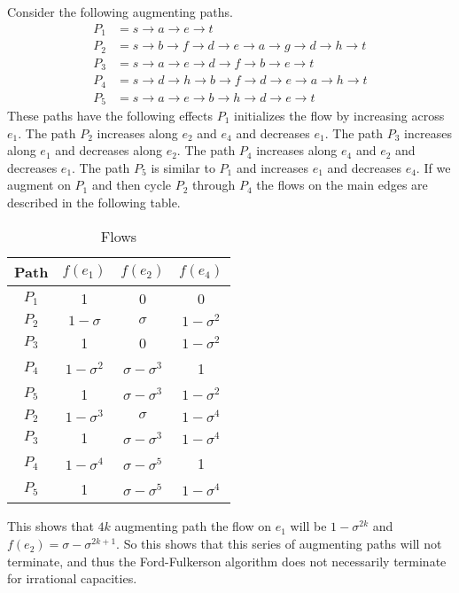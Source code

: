 \documentclass[11pt, oneside]{article}
\begin{document}
\begin{enumerate}
    Consider the following augmenting paths.
    \begin{align*}
      P_1 &= s \to a \to e \to t \\
      P_2 &= s \to b \to f \to d \to e \to a \to g \to d \to h \to t \\
      P_3 &= s \to a \to e \to d \to f \to b \to e \to t \\
      P_4 &= s \to d \to h \to b \to f \to d \to e \to a \to h \to t \\
      P_5 &= s \to a \to e \to b \to h \to d \to e \to t
    \end{align*}
    These paths have the following effects $P_1$ initializes the flow by
    increasing across $e_1$.
    The path $P_2$ increases along $e_2$ and $e_4$ and decreases $e_1$.
    The path $P_3$ increases along $e_1$ and decreases along $e_2$.
    The path $P_4$ increases along $e_4$ and $e_2$ and decreases $e_1$.
    The path $P_5$ is similar to $P_1$ and increases $e_1$ and decreases $e_4$.
    If we augment on $P_1$ and then cycle $P_2$ through $P_4$ the flows on the
    main edges are described in the following table.
    \begin{table}
      \centering
      \begin{tabular}{cccc}
        \toprule
        Path & $f(e_1)$ & $f(e_2)$ & $f(e_4)$ \\
        \midrule
        $P_1$ & 1              & 0                   & 0              \\
        $P_2$ & $1 - \sigma$   & $\sigma$            & $1 - \sigma^2$ \\
        $P_3$ & 1              & 0                   & $1 - \sigma^2$ \\
        $P_4$ & $1 - \sigma^2$ & $\sigma - \sigma^3$ & 1              \\
        $P_5$ & 1              & $\sigma - \sigma^3$ & $1 - \sigma^2$ \\
        $P_2$ & $1 - \sigma^3$ & $\sigma$            & $1 - \sigma^4$ \\
        $P_3$ & 1              & $\sigma - \sigma^3$ & $1 - \sigma^4$ \\
        $P_4$ & $1 - \sigma^4$ & $\sigma - \sigma^5$ & 1              \\
        $P_5$ & 1              & $\sigma - \sigma^5$ & $1 - \sigma^4$ \\
        \bottomrule
      \end{tabular}
      \caption{Flows}
    \end{table}
    This shows that $4k$ augmenting path the flow on $e_1$ will be
    $1 - \sigma^{2k}$ and $f(e_2) = \sigma - \sigma^{2k+1}$.
    So this shows that this series of augmenting paths will not terminate, and
    thus the Ford-Fulkerson algorithm does not necessarily terminate for
    irrational capacities.


\end{enumerate}
\end{document}
